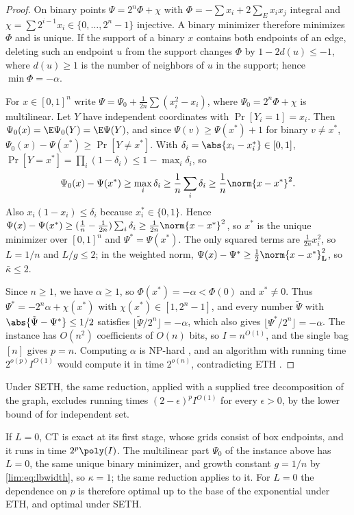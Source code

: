 \begin{proof}
On binary points $\Psi=2^n\Phi+\chi$ with $\Phi=-\sum x_i+2\sum_Ex_ix_j$
integral and $\chi=\sum2^{i-1}x_i\in\{0,\dots,2^n-1\}$ injective. A binary
minimizer therefore minimizes $\Phi$ and is unique. If the support of a
binary $x$ contains both endpoints of an edge, deleting such an endpoint $u$
from the support changes $\Phi$ by $1-2d(u)\le-1$, where $d(u)\ge1$ is the
number of neighbors of $u$ in the support; hence $\min\Phi=-\alpha$.

For $x\in[0,1]^n$ write $\Psi=\Psi_0+\frac1{2n}\sum(x_i^2-x_i)$, where
$\Psi_0=2^n\Phi+\chi$ is multilinear. Let $Y$ have independent coordinates
with $\Pr[Y_i=1]=x_i$. Then $\Psi_0(x)=\E\Psi_0(Y)=\E\Psi(Y)$, and since
$\Psi(v)\ge\Psi(x^*)+1$ for binary $v\ne x^*$,
$\Psi_0(x)-\Psi(x^*)\ge\Pr[Y\ne x^*]$. With
$\delta_i=\abs{x_i-x_i^*}\in[0,1]$,
$\Pr[Y=x^*]=\prod_i(1-\delta_i)\le1-\max_i\delta_i$, so
\begin{equation}\label{lim:eq:lbwidth}
\Psi_0(x)-\Psi(x^*)\ge\max_i\delta_i\ge\frac1n\sum_i\delta_i
\ge\frac1n\norm{x-x^*}^2 .
\end{equation}
Also $x_i(1-x_i)\le\delta_i$ because $x_i^*\in\{0,1\}$. Hence
$\Psi(x)-\Psi(x^*)\ge(\frac1n-\frac1{2n})\sum_i\delta_i\ge\frac1{2n}\norm{x-x^*}^2$,
so $x^*$ is the unique minimizer over $[0,1]^n$ and $\Psi^*=\Psi(x^*)$. The
only squared terms are $\frac1{2n}x_i^2$, so $L=1/n$ and $L/g\le2$; in the
weighted norm, $\Psi(x)-\Psi^*\ge\frac12\norm{x-x^*}_{\mathbf L}^2$, so
$\bar\kappa\le2$.

Since $n\ge1$, we have $\alpha\ge1$, so $\Phi(x^*)=-\alpha<\Phi(0)$ and
$x^*\ne0$. Thus $\Psi^*=-2^n\alpha+\chi(x^*)$ with
$\chi(x^*)\in[1,2^n-1]$, and every
number $\tilde\Psi$ with $\abs{\tilde\Psi-\Psi^*}\le1/2$ satisfies
$\lfloor\tilde\Psi/2^n\rfloor=-\alpha$, which
also gives $\lfloor\Psi^*/2^n\rfloor=-\alpha$. The instance has $O(n^2)$
coefficients of $O(n)$ bits, so $I=n^{O(1)}$, and the single bag $[n]$ gives
$p=n$. Computing $\alpha$ is NP-hard \cite{GareyJohnson1979}, and an
algorithm with running time $2^{o(p)}I^{O(1)}$ would compute it in time
$2^{o(n)}$, contradicting ETH \cite{ImpagliazzoPaturiZane2001}.
\end{proof}

Under SETH, the same reduction, applied with a supplied tree decomposition
of the graph, excludes running times $(2-\epsilon)^pI^{O(1)}$ for every
$\epsilon>0$, by the lower bound of \cite{LokshtanovMarxSaurabh2018} for
independent set.

If $L=0$, CT is exact at its first stage, whose grids consist of box
endpoints, and it runs in time $2^p\poly(I)$. The multilinear part $\Psi_0$
of the instance above has $L=0$, the same unique binary minimizer, and growth
constant $g=1/n$ by \eqref{lim:eq:lbwidth}, so $\kappa=1$; the same reduction
applies to it. For $L=0$ the dependence on $p$ is therefore optimal up to the
base of the exponential under ETH, and optimal under SETH.

